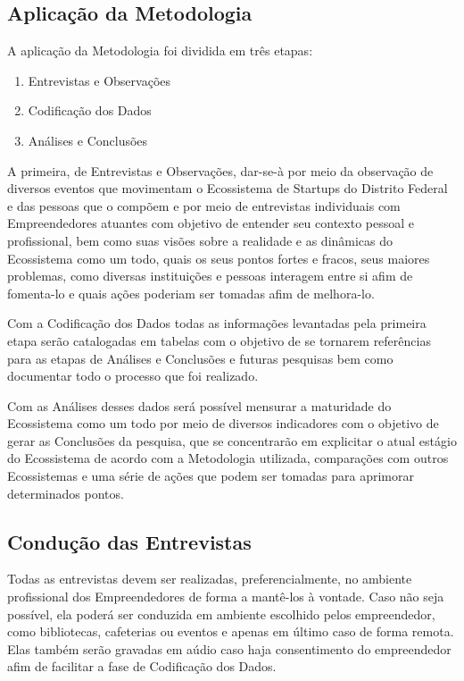 \subsection{Aplicação da Metodologia}
\label{subsection:aplicacao_da_metodologia}

A aplicação da Metodologia foi dividida em três etapas:

\begin{enumerate}
  \item Entrevistas e Observações
  \item Codificação dos Dados
  \item Análises e Conclusões
\end{enumerate}

A primeira, de Entrevistas e Observações, dar-se-à por meio da observação de diversos eventos que movimentam o Ecossistema de Startups do Distrito Federal e das pessoas que o compõem e por meio
de entrevistas individuais com Empreendedores atuantes com objetivo de entender seu contexto pessoal e profissional, bem como suas visões sobre a realidade e as dinâmicas do Ecossistema como um todo, quais os seus pontos fortes e fracos, seus maiores problemas, como diversas instituições e pessoas interagem entre si afim de fomenta-lo e quais ações poderiam ser tomadas afim de melhora-lo.

Com a Codificação dos Dados todas as informações levantadas pela primeira etapa serão catalogadas em tabelas com o objetivo de se tornarem referências para as etapas de Análises e Conclusões e
futuras pesquisas bem como documentar todo o processo que foi realizado. 

Com as Análises desses dados será possível mensurar a maturidade do Ecossistema como um todo por meio de diversos indicadores com o objetivo de gerar as Conclusões da pesquisa, que se concentrarão em explicitar o atual estágio do Ecossistema de acordo com a Metodologia utilizada, comparações com outros Ecossistemas e uma série de ações que podem ser tomadas para aprimorar determinados pontos.

\subsection{Condução das Entrevistas}
\label{subsection:conducao_das_entrevistas}

Todas as entrevistas devem ser realizadas, preferencialmente, no ambiente profissional dos Empreendedores de forma a mantê-los à vontade. Caso não seja possível, ela poderá ser conduzida em ambiente
escolhido pelos empreendedor, como bibliotecas, cafeterias ou eventos e apenas em último caso de forma remota. Elas também serão gravadas em aúdio caso haja consentimento do empreendedor afim de
facilitar a fase de Codificação dos Dados.

